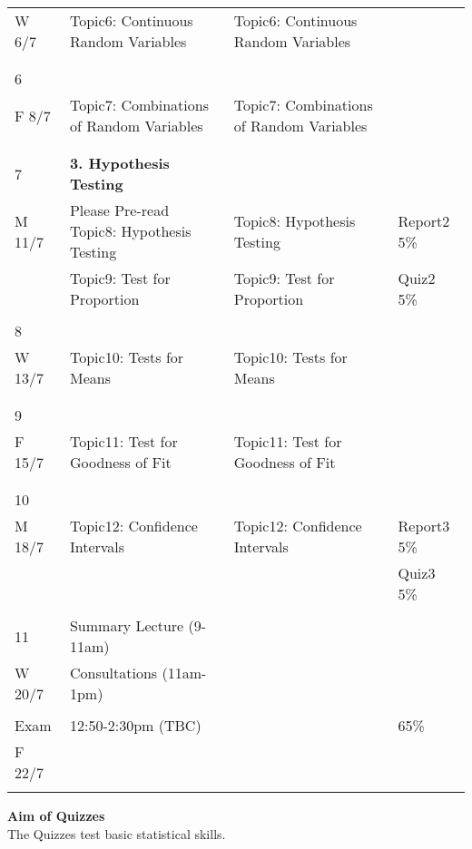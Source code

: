 \documentclass[bigtut]{quiz}\usepackage[]{graphicx}\usepackage[]{color}
\begin{document}
\begin{tutorial}
{\begin{tabular}{|l|l|l|l|}
W 6/7 & Topic6: Continuous Random Variables & Topic6:  Continuous Random Variables  & \\ 
& &  & \\ 
&  & & \\ \hline
6 &   &   & \\
F 8/7 & Topic7: Combinations of Random Variables  & Topic7: Combinations of Random Variables &  \\ 
& &  & \\ 
& & & \\ \hline
7 & {\bf 3. Hypothesis Testing} & &   \\
M 11/7 & Please Pre-read Topic8: Hypothesis Testing   & Topic8: Hypothesis Testing    & Report2 5\%    \\ 
&  Topic9: Test for Proportion    & Topic9: Test for Proportion  & Quiz2 5\%  \\ 
& & & \\ \hline
8 &    &  &  \\
W 13/7 & Topic10: Tests for Means & Topic10: Tests for Means &  \\ 
& & &  \\ 
& & & \\ \hline
9 &  &     &  \\
F 15/7 & Topic11: Test for Goodness of Fit  & Topic11: Test for Goodness of Fit   &   \\ 
& &  & \\ 
& & & \\ \hline
10 &  &  &   \\
M 18/7 &  Topic12: Confidence Intervals  &  Topic12: Confidence Intervals & Report3 5\%  \\   
& &   & Quiz3 5\%  \\ 
& &  & \\  \hline
11 & Summary Lecture (9-11am)  & &  \\
W 20/7 & Consultations (11am-1pm) &  &  \\ 
& & &  \\ \hline
Exam  &   12:50-2:30pm (TBC) &  & 65\%   \\
 F 22/7  & &  &  \\
& & & \\ \hline
\end{tabular} }

\newpage
{\bf Aim of Quizzes} \\
The Quizzes test basic statistical skills.   


\end{tutorial}
\end{document}
